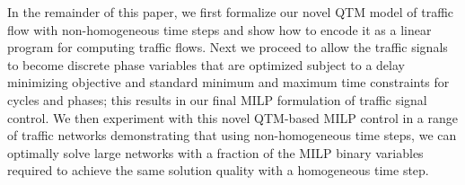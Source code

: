 In the remainder of this paper, we first formalize our
novel QTM model of traffic flow with non-homogeneous time steps and
show how to encode it as a linear program for computing traffic flows.
%
Next we proceed to allow the traffic signals to become discrete phase
variables that are optimized subject to a delay minimizing objective
and standard minimum and maximum time constraints for cycles and
phases; this results in our final MILP formulation of traffic signal
control.
%
We then experiment with this novel QTM-based MILP control in a range
of traffic networks demonstrating that using non-homogeneous time steps, we can
optimally solve large networks with a fraction of the MILP binary
variables required to achieve the same solution quality with a
homogeneous time step.
%
%
%


